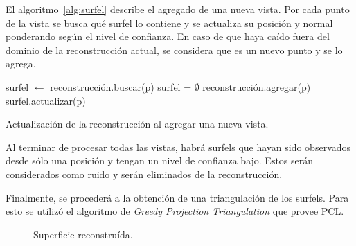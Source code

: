 	El algoritmo~\ref{alg:surfel} describe el agregado de una nueva vista.
	Por cada punto de la vista se busca qué surfel lo contiene y se actualiza
	su posición y normal ponderando según el nivel de confianza.
	En caso de que haya caído fuera del dominio de la reconstrucción actual, se
	considera que es un nuevo punto y se lo agrega.

	\begin{algorithm}
		\begin{algorithmic}[1]
					\State surfel $\gets$ reconstrucción.buscar(p)
					\If surfel = $\emptyset$
						\State reconstrucción.agregar(p)
					\Else
						\State surfel.actualizar(p)
					\EndIf
				\EndFor
			\EndFunction
		\end{algorithmic}
		\caption{\label{alg:surfel}Actualización de la reconstrucción al agregar una nueva vista.}
	\end{algorithm}

	Al terminar de procesar todas las vistas, habrá surfels que hayan sido
	observados desde sólo una posición y tengan un nivel de confianza bajo.
	Estos serán considerados como ruido y serán eliminados de la
	reconstrucción.

	Finalmente, se procederá a la obtención de una triangulación de los surfels.
	Para esto se utilizó el algoritmo de \emph{Greedy Projection Triangulation} que provee PCL.

	\begin{figure}
		\caption{\label{fig:surface}Superficie reconstruída.}
	\end{figure}
